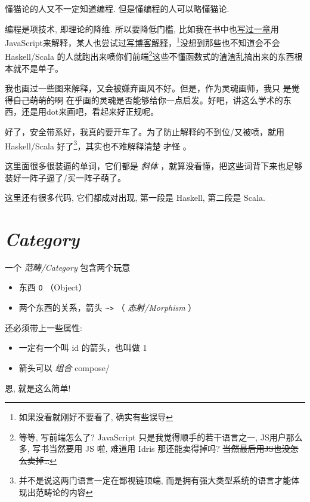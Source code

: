 \documentclass[11pt]{tufte-book}
\begin{document}
懂猫论的人又不一定知道编程. 但是懂编程的人可以略懂猫论.

编程是项技术, 即理论的降维. 所以要降低门槛, 比如我在书中也\href{https://book.douban.com/subject/26883736/}{写过一章}用JavaScript来解释，某人也尝试过\href{http://www.ruanyifeng.com/blog/2017/02/fp-tutorial.html}{写博客解释}，\footnote{如果没看就刚好不要看了, 确实有些误导}没想到那些也不知道会不会 Haskell/Scala 的人就跑出来喷你们前端\footnote{等等, 写前端怎么了? JavaScript 只是我觉得顺手的若干语言之一, JS用户那么多, 写书当然要用 JS 啦, 难道用 Idris 那还能卖得掉吗? \sout{当然最后用JS也没怎么卖掉\ldots{}}}这些不懂函数式的渣渣乱搞出来的东西根本就不是单子。

我也画过一些图来解释，又会被嫌弃画风不好。但是，作为灵魂画师，我只 \sout{是觉得自己萌萌的啊} 在乎画的灵魂是否能够给你一点启发。好吧，讲这么学术的东西，还是用dot来画吧，看起来好正规呢。

好了，安全带系好，我真的要开车了。为了防止解释的不到位/又被喷，就用 Haskell/Scala 好了\footnote{并不是说这两门语言一定在鄙视链顶端, 而是拥有强大类型系统的语言才能体现出范畴论的内容}，其实也不难解释清楚 \sout{才怪} 。

这里面很多很装逼的单词，它们都是 \emph{斜体} ，就算没看懂，把这些词背下来也足够装好一阵子逼了/买一阵子萌了。

这里还有很多代码, 它们都成对出现, 第一段是 Haskell, 第二段是 Scala.

\chapter{\emph{Category}}
\label{sec:org7808b7f}

一个 \emph{范畴/Category} 包含两个玩意
\begin{itemize}
\item 东西 \texttt{O} （Object）
\item 两个东西的关系，箭头 \texttt{\textasciitilde{}>} （ \emph{态射/Morphism} ）
\end{itemize}

还必须带上一些属性: 
\begin{itemize}
\item 一定有一个叫 id 的箭头，也叫做 1
\item 箭头可以 \emph{组合} compose/
\end{itemize}

恩, 就是这么简单!
\end{document}
